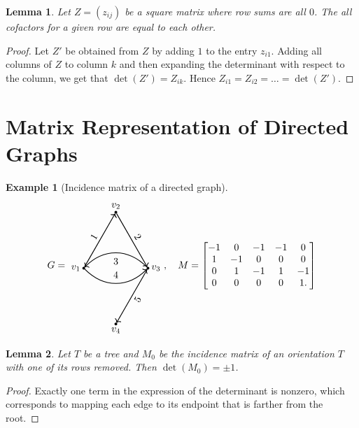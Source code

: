 \documentclass{report}
\newtheorem{lemma}{Lemma}[section]
\theoremstyle{definition}
\newtheorem{example}{Example}[section]
\theoremstyle{remark}
\numberwithin{equation}{section}
\newcommand{\fnl}{\parbox[t]{0\linewidth}{}}
\begin{document}
\begin{lemma}
    Let $Z = (z_{ij})$ be a square matrix where row sums are all $0$. The all cofactors for a given row are equal to each other.
\end{lemma}
\begin{proof}
    Let $Z'$ be obtained from $Z$ by adding $1$ to the entry $z_{i1}$. Adding all columns of $Z$ to column $k$ and then expanding the determinant with respect to the column, we get that $\det(Z') = Z_{ik}$. Hence $Z_{i1} = Z_{i2} = \ldots = \det(Z')$.
\end{proof}

\section{Matrix Representation of Directed Graphs}
\begin{example}[Incidence matrix of a directed graph]
    \fnl
    \[G = \begin{tikzpicture}[baseline=(current bounding box.center)]
        \node[shape=circle, fill=black, scale = 0.3] (A1) at ({-2*sqrt(3)/3}, 0) {};
        \node[left] at (A1) {$v_1$};
        \node[shape=circle, fill=black, scale = 0.3] (A2) at (0, 2) {};
        \node[above] at (A2) {$v_2$};
        \node[shape=circle, fill=black, scale = 0.3] (A3) at ({2*sqrt(3)/3}, 0) {};
        \node[right] at (A3) {$v_3$};
        \node[shape=circle, fill=black, scale = 0.3] (A4) at (0, -2) {};
        \node[below] at (A4) {$v_4$};

        \draw[->, thick] (A1) -- (A2) node[midway, above, sloped] {1};
        \draw[->, thick] (A2) -- (A3) node[midway, above, sloped] {2};
        \draw[->, thick] (A3) to [out=135,in=45,looseness=1.1] (A1) node[midway, above, sloped] {3};
        \draw[->, thick] (A1) to [out=-45,in=-135,looseness=1.1] (A3) node[midway, below, sloped] {4};
        \draw[->, thick] (A3) -- (A4) node[midway, below, sloped] {5};
    \end{tikzpicture}, \quad M = \begin{bmatrix}
        -1 & 0 & -1 & -1 & 0 \\
        1 & -1 & 0 & 0 & 0 \\
        0 & 1 & -1 & 1 & -1 \\
        0 & 0 & 0 & 0 & 1.
    \end{bmatrix}\]
\end{example}
\begin{lemma}
    Let $T$ be a tree and $M_0$ be the incidence matrix of an orientation $T$ with one of its rows removed. Then $\det(M_0) = \pm 1$.
\end{lemma}
\begin{proof}
    Exactly one term in the expression of the determinant is nonzero, which corresponds to mapping each edge to its endpoint that is farther from the root.
\end{proof}
\end{document}
